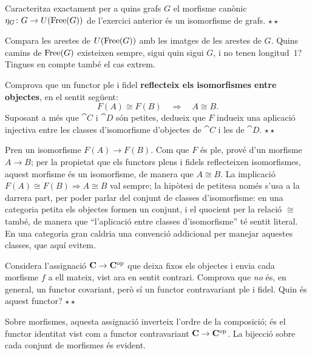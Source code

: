 \begin{exercici}[Ampliació]
Caracteritza exactament per a quins grafs $G$ el morfisme canònic $\eta_G\colon G\to U(\operatorname{Free}(G))$ de l'exercici anterior és un isomorfisme de grafs. \hfill{\normalfont$\star\star$}
\begin{indicacio}
Compara les arestes de $U(\operatorname{Free}(G))$ amb les imatges de les arestes de $G$. Quins camins de $\operatorname{Free}(G)$ existeixen sempre, sigui quin sigui $G$, i no tenen longitud~$1$? Tingues en compte també el cas extrem.
\end{indicacio}
\end{exercici}

\begin{exercici}
Comprova que un functor ple i fidel \textbf{reflecteix els isomorfismes entre objectes}, en el sentit següent:
\[
F(A)\cong F(B)\quad\Longrightarrow\quad A\cong B.
\]
Suposant a més que $\cat{C}$ i $\cat{D}$ són petites, dedueix que $F$ indueix una aplicació injectiva entre les classes d'isomorfisme d'objectes de $\cat{C}$ i les de $\cat{D}$. \hfill{\normalfont$\star\star$}
\begin{indicacio}
Pren un isomorfisme $F(A)\to F(B)$. Com que $F$ és ple, prové d'un morfisme $A\to B$; per la propietat que els functors plens i fidels reflecteixen isomorfismes, aquest morfisme és un isomorfisme, de manera que $A\cong B$. La implicació $F(A)\cong F(B)\Rightarrow A\cong B$ val sempre; la hipòtesi de petitesa només s'usa a la darrera part, per poder parlar del conjunt de classes d'isomorfisme: en una categoria petita els objectes formen un conjunt, i el quocient per la relació $\cong$ també, de manera que \enquote{l'aplicació entre classes d'isomorfisme} té sentit literal. En una categoria gran caldria una convenció addicional per manejar aquestes classes, que aquí evitem.
\end{indicacio}
\end{exercici}

\begin{exercici}
Considera l'assignació $\mathbf{C}\to\mathbf{C}^{\mathrm{op}}$ que deixa fixos els objectes i envia cada morfisme $f$ a ell mateix, vist ara en sentit contrari. Comprova que \emph{no} és, en general, un functor covariant, però sí un functor contravariant ple i fidel. Quin és aquest functor? \hfill{\normalfont$\star\star$}
\begin{indicacio}
Sobre morfismes, aquesta assignació inverteix l'ordre de la composició; és el functor identitat vist com a functor contravariant $\mathbf{C}\to\mathbf{C}^{\mathrm{op}}$. La bijecció sobre cada conjunt de morfismes és evident.
\end{indicacio}
\end{exercici}

